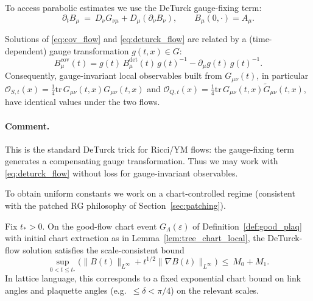 To access parabolic estimates we use the DeTurck gauge-fixing term:
\begin{equation}\label{eq:deturck_flow}
\partial_t B_\mu \ =\ D_\nu G_{\nu\mu} + D_\mu(\partial_\nu B_\nu),\qquad B_\mu(0,\cdot)=A_\mu.
\end{equation}

\begin{proposition}\label{prop:deturck_equiv}
Solutions of \eqref{eq:cov_flow} and \eqref{eq:deturck_flow} are related by a (time-dependent) gauge transformation $g(t,x)\in G$:
\[
B^{\mathrm{cov}}_\mu(t)=g(t)\,B^{\mathrm{det}}_\mu(t)\,g(t)^{-1}-\partial_\mu g(t)\,g(t)^{-1}.
\]
Consequently, gauge-invariant local observables built from $G_{\mu\nu}(t)$, in particular
$\mathcal O_{S,t}(x)=\tfrac14\mathrm{tr}\,G_{\mu\nu}(t,x)G_{\mu\nu}(t,x)$ and
$\mathcal O_{Q,t}(x)=\tfrac14\mathrm{tr}\,G_{\mu\nu}(t,x)\widetilde G_{\mu\nu}(t,x)$,
have identical values under the two flows.
\end{proposition}

\paragraph{Comment.}
This is the standard DeTurck trick for Ricci/YM flows: the gauge-fixing term generates a compensating gauge transformation.
Thus we may work with \eqref{eq:deturck_flow} without loss for gauge-invariant observables.

To obtain uniform constants we work on a chart-controlled regime (consistent with the patched RG philosophy of Section~\ref{sec:patching}).

\begin{proposition}\label{ass:bounded_regime}
Fix $t_\ast>0$. On the good-flow chart event $G_{\Lambda}(\varepsilon)$ of Definition~\ref{def:good_plaq} with initial chart extraction as in
Lemma~\ref{lem:tree_chart_local}, the DeTurck-flow solution satisfies the scale-consistent bound
\begin{equation}\label{eq:bounds_B}
\sup_{0<t\le t_\ast}\Big(\|B(t)\|_{L^\infty}+ t^{1/2}\|\nabla B(t)\|_{L^\infty}\Big)\ \le\ M_0+M_1.
\end{equation}
In lattice language, this corresponds to a fixed exponential chart bound on link angles and plaquette angles (e.g.\ $\le\delta<\pi/4$) on the relevant scales.
\end{proposition}

